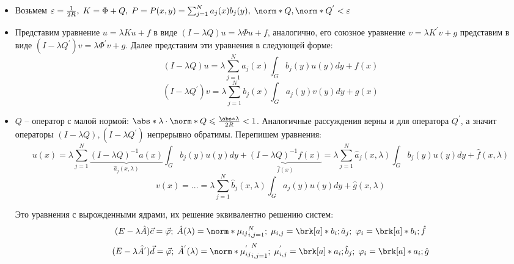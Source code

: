 \begin{itemize}
  \item Возьмем $\varepsilon = \frac{1}{2R}, \; K = \Phi + Q, \; P = P(x,y)=\sum_{j = 1}^{N} a_{j}(x)b_{j}(y), \; \norm*{Q}, \norm*{Q^{'}} < \varepsilon$
  \item Представим уравнение $u = \lambda Ku +f$ в виде $(I -\lambda Q)u = \lambda \Phi u + f$, аналогично, его союзное уравнение $v = \lambda K^{'}v +g$ представим в виде $(I -\lambda Q^{'})v = \lambda \Phi^{'} v + g$. Далее представим эти уравнения в следующей форме:
  $$ (I - \lambda Q)u = \lambda \sum_{j = 1}^{N}a_{j}(x)\int_{G}b_{j}(y)u(y)dy + f(x)$$
  $$ (I - \lambda Q^{'})v = \lambda \sum_{j = 1}^{N}b_{j}(x)\int_{G}a_{j}(y)v(y)dy + g(x)$$
  \item $Q$ -- оператор с малой нормой: $\abs*{\lambda}\cdot\norm*{Q} \leq \frac{\abs*{\lambda}}{2R} < 1$. Аналогичные рассуждения верны и для оператора $Q^{'}$, а значит операторы $(I - \lambda Q), (I - \lambda Q^{'})$ непрерывно обратимы. Перепишем уравнения:
  $$u(x) = \lambda \sum_{j = 1}^{N}\underbrace{(I - \lambda Q)^{-1}a(x)}_{\hat{a}_{j}(x,\lambda)}\int_{G}b_{j}(y)u(y)dy + \underbrace{(I - \lambda Q)^{-1}f(x)}_{\hat{f}(x)} = \lambda \sum_{j = 1}^{N}\hat{a}_{j}(x,\lambda)\int_{G}b_{j}(y)u(y)dy + \hat{f}(x,\lambda)$$
  $$v(x) = ... = \lambda \sum_{j = 1}^{N}\hat{b}_{j}(x,\lambda)\int_{G}a_{j}(y)u(y)dy + \hat{g}(x,\lambda)$$
  
  Это уравнения с вырожденными ядрами, их решение эквивалентно решению систем:
  $$(E - \lambda \hat{A})\vec{c} = \vec{\varphi}; \; \hat{A}(\lambda) = \norm*{\mu_{ij}}_{i,j=1}^{N}; \; \mu_{i,j} = \brk[a]*{b_{i}; \hat{a}_{j}}; \; \varphi_{i} = \brk[a]*{b_{i}; \hat{f}}$$
  $$(E - \lambda \hat{A^{'}})\vec{d} = \vec{\phi}; \; \hat{A}^{'}(\lambda) = \norm*{\mu^{'}_{ij}}_{i,j=1}^{N}; \; \mu^{'}_{i,j} = \brk[a]*{a_{i}; \hat{b}_{j}}; \; \phi_{i} = \brk[a]*{a_{i}; \hat{g}}$$
  

\end{itemize}
